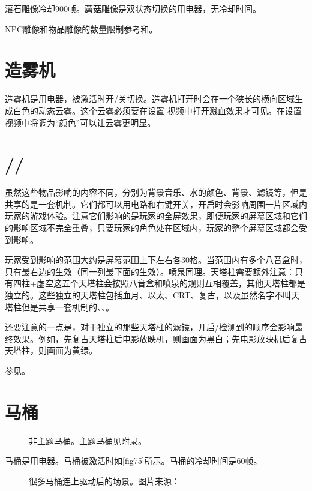滚石雕像冷却900帧。蘑菇雕像是双状态切换的用电器，无冷却时间。

\begin{remark*}{}{}
  NPC雕像和物品雕像的数量限制参考和。
\end{remark*}

\section{造雾机}
\begin{center}
\end{center}
造雾机是用电器，被激活时开/关切换。造雾机打开时会在一个狭长的横向区域生成白色的动态云雾。这个云雾必须要在设置-视频中打开溅血效果才可见。在设置-视频中将调为“颜色”可以让云雾更明显。

\section{//}
虽然这些物品影响的内容不同，分别为背景音乐、水的颜色、背景、滤镜等，但是共享的是一套机制。它们都可以用电路和右键开关，开启时会影响周围一片区域内玩家的游戏体验。注意它们影响的是玩家的全屏效果，即便玩家的屏幕区域和它们的影响区域不完全重叠，只要玩家的角色处在区域内，玩家的整个屏幕区域都会受到影响。

玩家受到影响的范围大约是屏幕范围上下左右各30格。当范围内有多个八音盒时，只有最右边的生效（同一列最下面的生效）。喷泉同理。天塔柱需要额外注意：只有四柱+虚空这五个天塔柱会按照八音盒和喷泉的规则互相覆盖，其他天塔柱都是独立的。这些独立的天塔柱包括血月、以太、CRT、复古，以及虽然名字不叫天塔柱但是共享一套机制的、、。

还要注意的一点是，对于独立的那些天塔柱的滤镜，开启/检测到的顺序会影响最终效果。例如，先复古天塔柱后电影放映机，则画面为黑白；先电影放映机后复古天塔柱，则画面为黄绿。

\begin{remark*}{}{}
  参见。
\end{remark*}

\section{马桶}\label{sec:toilet}
\begin{figure}[!ht]
  \centering
  \quad{}
  \caption{非主题马桶。主题马桶见\hyperref[app44]{附录}。}
\end{figure}
马桶是用电器。马桶被激活时如\autoref{fig75}所示。马桶的冷却时间是60帧。
\begin{figure}[!ht]
  \centering
  \caption{很多马桶连上驱动后的场景。图片来源：\protect{}}\label{fig75}
\end{figure}

